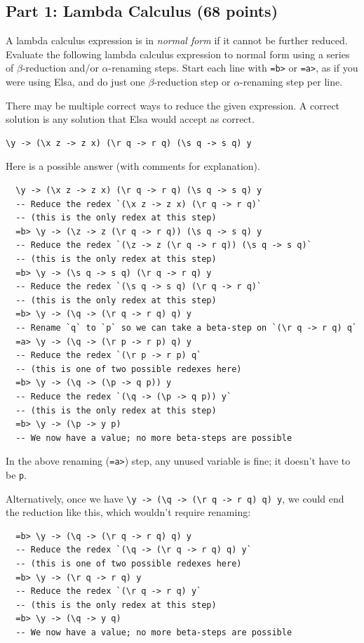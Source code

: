 \documentclass[addpoints]{exam}
\begin{document}
\subsection*{\textbf{Part 1: Lambda Calculus (68 points)}}

\begin{questions}

\question[6] A lambda calculus expression is in \emph{normal form} if it cannot be further reduced.  Evaluate the following lambda calculus expression to normal form using a series of $\beta$-reduction and/or $\alpha$-renaming steps.  Start each line with \texttt{=b>} or \texttt{=a>}, as if you were using Elsa, and do just one $\beta$-reduction step or $\alpha$-renaming step per line.

There may be multiple correct ways to reduce the given expression.  A correct solution is any solution that Elsa would accept as correct.

\begin{verbatim}
\y -> (\x z -> z x) (\r q -> r q) (\s q -> s q) y
\end{verbatim}
\begin{solutionorbox}[\stretch{1}]
Here is a possible answer (with comments for explanation).
\begin{verbatim}
  \y -> (\x z -> z x) (\r q -> r q) (\s q -> s q) y
  -- Reduce the redex `(\x z -> z x) (\r q -> r q)`
  -- (this is the only redex at this step)
  =b> \y -> (\z -> z (\r q -> r q)) (\s q -> s q) y
  -- Reduce the redex `(\z -> z (\r q -> r q)) (\s q -> s q)`
  -- (this is the only redex at this step)
  =b> \y -> (\s q -> s q) (\r q -> r q) y
  -- Reduce the redex `(\s q -> s q) (\r q -> r q)`
  -- (this is the only redex at this step)
  =b> \y -> (\q -> (\r q -> r q) q) y
  -- Rename `q` to `p` so we can take a beta-step on `(\r q -> r q) q`
  =a> \y -> (\q -> (\r p -> r p) q) y
  -- Reduce the redex `(\r p -> r p) q`
  -- (this is one of two possible redexes here)
  =b> \y -> (\q -> (\p -> q p)) y
  -- Reduce the redex `(\q -> (\p -> q p)) y`
  -- (this is the only redex at this step)
  =b> \y -> (\p -> y p)
  -- We now have a value; no more beta-steps are possible
\end{verbatim}
In the above renaming (\verb|=a>|) step, any unused variable is fine; it doesn’t have to be \verb|p|.

Alternatively, once we have \verb|\y -> (\q -> (\r q -> r q) q) y|, we could end the reduction like this, which wouldn't require renaming:
\begin{verbatim}
  =b> \y -> (\q -> (\r q -> r q) q) y
  -- Reduce the redex `(\q -> (\r q -> r q) q) y`
  -- (this is one of two possible redexes here)
  =b> \y -> (\r q -> r q) y
  -- Reduce the redex `(\r q -> r q) y`
  -- (this is the only redex at this step)
  =b> \y -> (\q -> y q)
  -- We now have a value; no more beta-steps are possible
\end{verbatim}


\end{solutionorbox}
\end{questions}
\end{document}
